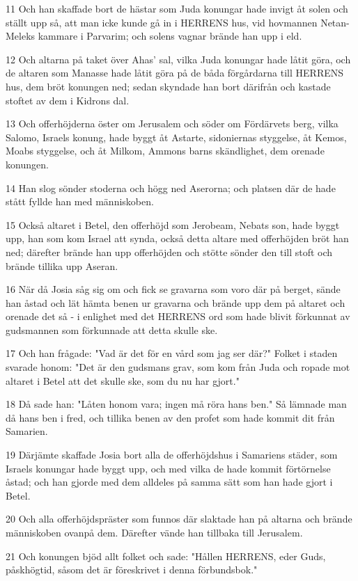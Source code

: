 \par 11 Och han skaffade bort de hästar som Juda konungar hade invigt åt solen och ställt upp så, att man icke kunde gå in i HERRENS hus, vid hovmannen Netan-Meleks kammare i Parvarim; och solens vagnar brände han upp i eld.
\par 12 Och altarna på taket över Ahas' sal, vilka Juda konungar hade låtit göra, och de altaren som Manasse hade låtit göra på de båda förgårdarna till HERRENS hus, dem bröt konungen ned; sedan skyndade han bort därifrån och kastade stoftet av dem i Kidrons dal.
\par 13 Och offerhöjderna öster om Jerusalem och söder om Fördärvets berg, vilka Salomo, Israels konung, hade byggt åt Astarte, sidoniernas styggelse, åt Kemos, Moabs styggelse, och åt Milkom, Ammons barns skändlighet, dem orenade konungen.
\par 14 Han slog sönder stoderna och högg ned Aserorna; och platsen där de hade stått fyllde han med människoben.
\par 15 Också altaret i Betel, den offerhöjd som Jerobeam, Nebats son, hade byggt upp, han som kom Israel att synda, också detta altare med offerhöjden bröt han ned; därefter brände han upp offerhöjden och stötte sönder den till stoft och brände tillika upp Aseran.
\par 16 När då Josia såg sig om och fick se gravarna som voro där på berget, sände han åstad och lät hämta benen ur gravarna och brände upp dem på altaret och orenade det så - i enlighet med det HERRENS ord som hade blivit förkunnat av gudsmannen som förkunnade att detta skulle ske.
\par 17 Och han frågade: "Vad är det för en vård som jag ser där?" Folket i staden svarade honom: "Det är den gudsmans grav, som kom från Juda och ropade mot altaret i Betel att det skulle ske, som du nu har gjort."
\par 18 Då sade han: "Låten honom vara; ingen må röra hans ben." Så lämnade man då hans ben i fred, och tillika benen av den profet som hade kommit dit från Samarien.
\par 19 Därjämte skaffade Josia bort alla de offerhöjdshus i Samariens städer, som Israels konungar hade byggt upp, och med vilka de hade kommit förtörnelse åstad; och han gjorde med dem alldeles på samma sätt som han hade gjort i Betel.
\par 20 Och alla offerhöjdspräster som funnos där slaktade han på altarna och brände människoben ovanpå dem. Därefter vände han tillbaka till Jerusalem.
\par 21 Och konungen bjöd allt folket och sade: "Hållen HERRENS, eder Guds, påskhögtid, såsom det är föreskrivet i denna förbundsbok."
